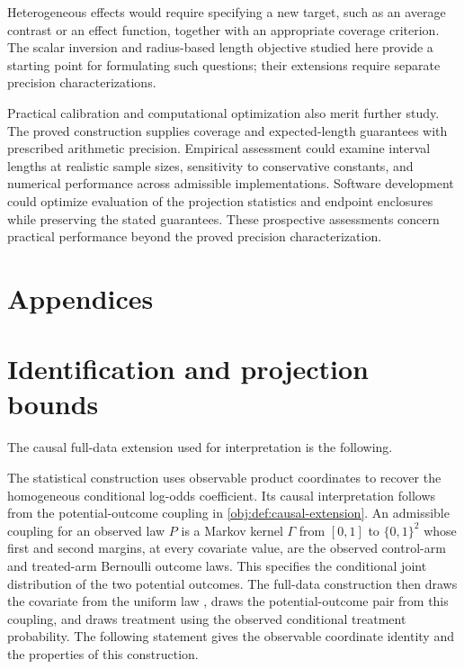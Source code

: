 \documentclass[11pt]{article}
\begin{document}
Heterogeneous effects would require specifying a new target, such as an average contrast or an effect function, together with an appropriate coverage criterion. The scalar inversion and radius-based length objective studied here provide a starting point for formulating such questions; their extensions require separate precision characterizations.

Practical calibration and computational optimization also merit further study. The proved construction supplies coverage and expected-length guarantees with prescribed arithmetic precision. Empirical assessment could examine interval lengths at realistic sample sizes, sensitivity to conservative constants, and numerical performance across admissible implementations. Software development could optimize evaluation of the projection statistics and endpoint enclosures while preserving the stated guarantees. These prospective assessments concern practical performance beyond the proved precision characterization.


\appendix

\section*{Appendices}

\section{Identification and projection bounds}

The causal full-data extension used for interpretation is the following.

The statistical construction uses observable product coordinates to recover the homogeneous conditional log-odds coefficient. Its causal interpretation follows from the potential-outcome coupling in \cref{obj:def:causal-extension}. An admissible coupling for an observed law \(P\) is a Markov kernel \(\Gamma\) from \([0,1]\) to \(\{0,1\}^2\) whose first and second margins, at every covariate value, are the observed control-arm and treated-arm Bernoulli outcome laws. This specifies the conditional joint distribution of the two potential outcomes. The full-data construction then draws the covariate from the uniform law , draws the potential-outcome pair from this coupling, and draws treatment using the observed conditional treatment probability. The following statement gives the observable coordinate identity and the properties of this construction.
\end{document}
